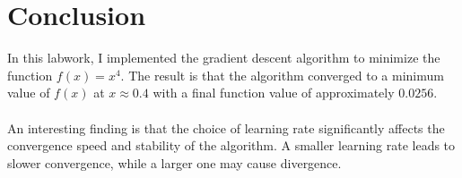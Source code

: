 \documentclass{article}
\begin{document}
\section{Conclusion}

In this labwork, I implemented the gradient descent algorithm to minimize the function $f(x) = x^4$.
The result is that the algorithm converged to a minimum value of $f(x)$ at $x \approx 0.4$ with a final function value of approximately $0.0256$.\\
\\
An interesting finding is that the choice of learning rate significantly affects the convergence speed and stability of the algorithm. A smaller learning rate leads to slower convergence, while a larger one may cause divergence.
\end{document}
